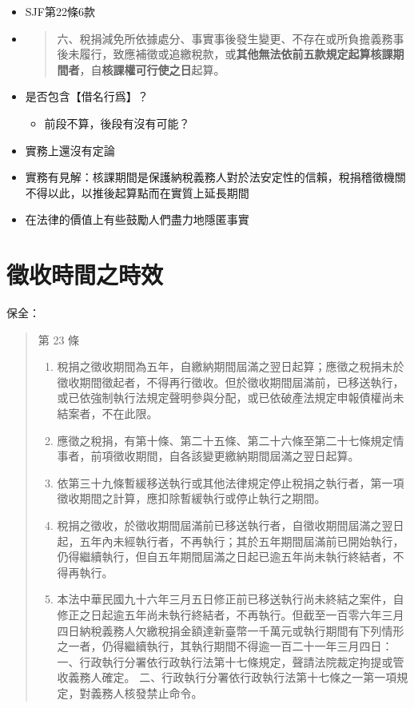 \documentclass[]{ctexbook}
\providecommand{\tightlist}{%
  \setlength{\itemsep}{0pt}\setlength{\parskip}{0pt}}
\begin{document}
\begin{itemize}
\item
  SJF第22條6款
\item
  \begin{quote}
  六、稅捐減免所依據處分、事實事後發生變更、不存在或所負擔義務事後未履行，致應補徵或追繳稅款，或\textbf{其他無法依前五款規定起算核課期間者}，自\textbf{核課權可行使之日}起算。
  \end{quote}
\item
  是否包含【借名行爲】？

  \begin{itemize}
  \tightlist
  \item
    前段不算，後段有沒有可能？
  \end{itemize}
\item
  實務上還沒有定論
\item
  實務有見解：核課期間是保護納稅義務人對於法安定性的信賴，稅捐稽徵機關不得以此，以推後起算點而在實質上延長期間
\item
  在法律的價值上有些鼓勵人們盡力地隱匿事實
\end{itemize}

\hypertarget{ux5fb5ux6536ux6642ux9593ux4e4bux6642ux6548}{%
\section{徵收時間之時效}\label{ux5fb5ux6536ux6642ux9593ux4e4bux6642ux6548}}

保全：

\begin{quote}
第 23 條

\begin{enumerate}
\def\labelenumi{\arabic{enumi}.}
\tightlist
\item
  稅捐之徵收期間為五年，自繳納期間屆滿之翌日起算；應徵之稅捐未於徵收期間徵起者，不得再行徵收。但於徵收期間屆滿前，已移送執行，或已依強制執行法規定聲明參與分配，或已依破產法規定申報債權尚未結案者，不在此限。
\item
  應徵之稅捐，有第十條、第二十五條、第二十六條至第二十七條規定情事者，前項徵收期間，自各該變更繳納期間屆滿之翌日起算。
\item
  依第三十九條暫緩移送執行或其他法律規定停止稅捐之執行者，第一項徵收期間之計算，應扣除暫緩執行或停止執行之期間。
\item
  稅捐之徵收，於徵收期間屆滿前已移送執行者，自徵收期間屆滿之翌日起，五年內未經執行者，不再執行；其於五年期間屆滿前已開始執行，仍得繼續執行，但自五年期間屆滿之日起已逾五年尚未執行終結者，不得再執行。
\item
  本法中華民國九十六年三月五日修正前已移送執行尚未終結之案件，自修正之日起逾五年尚未執行終結者，不再執行。但截至一百零六年三月四日納稅義務人欠繳稅捐金額達新臺幣一千萬元或執行期間有下列情形之一者，仍得繼續執行，其執行期間不得逾一百二十一年三月四日：
  一、行政執行分署依行政執行法第十七條規定，聲請法院裁定拘提或管收義務人確定。
  二、行政執行分署依行政執行法第十七條之一第一項規定，對義務人核發禁止命令。
\end{enumerate}
\end{quote}
\end{document}
